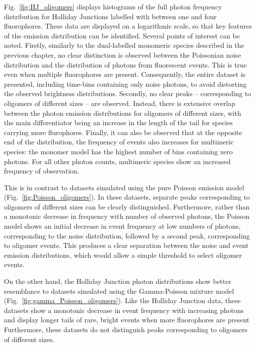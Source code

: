 Fig.~\ref{fig:HJ_oligomers} displays histograms of the full photon frequency distribution for Holliday Junctions labelled with between one and four fluorophores. These data are displayed on a logarithmic scale, so that key features of the emission distribution can be identified. Several points of interest can be noted. Firstly, similarly to the dual-labelled monomeric species described in the previous chapter, no clear distinction is observed between the Poissonian noise distribution and the distribution of photons from fluorescent events. This is true even when multiple fluorophores are present. Consequently, the entire dataset is presented, including time-bins containing only noise photons, to avoid distorting the observed brightness distributions. Secondly, no clear peaks -- corresponding to oligomers of different sizes -- are observed. Instead, there is extensive overlap between the photon emission distributions for oligomers of different sizes, with the main differentiator being an increase in the length of the tail for species carrying more flurophores. Finally, it can also be observed that at the opposite end of the distribution, the frequency of events also increases for multimeric species: the monomer model has the highest number of bins containing zero photons. For all other photon counts, multimeric species show an increased frequency of observation. 

This is in contrast to datasets simulated using the pure Poisson emission model (Fig.~\ref{fig:Poisson_oligomers}). In these datasets, separate peaks corresponding to oligomers of different sizes can be clearly distinguished. Furthermore, rather than a monotonic decrease in frequency with number of observed photons, the Poisson model shows an initial decrease in event frequency at low numbers of photons, corresponding to the noise distribution, followed by a second peak, corresponding to oligomer events. This produces a clear separation between the noise and event emission distributions, which would allow a simple threshold to select oligomer events. 

On the other hand, the Holliday Junction photon distributions show better resemblance to datasets simulated using the Gamma-Poisson mixture model (Fig.~\ref{fig:gamma_Poisson_oligomers}). Like the Holliday Junction data, these datasets show a monotonic decrease in event frequency with increasing photons and display longer tails of rare, bright events when more fluorophores are present Furthermore, these datasets do not distinguish peaks corresponding to oligomers of different sizes. 

